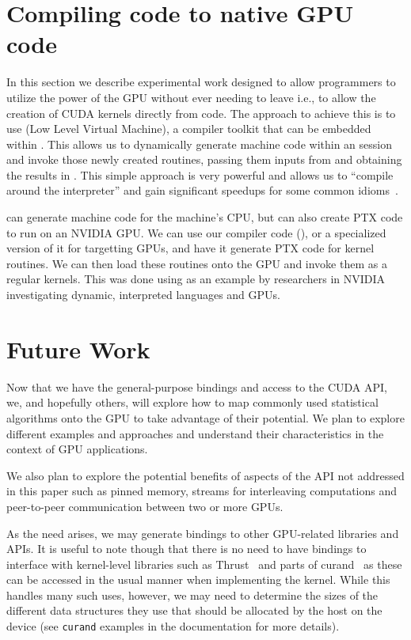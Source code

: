 \documentclass[article]{jss}
\def\R{\proglang{R}}
\def\llvm{\proglang{LLVM}}
\def\Rpkg#1{\pkg{#1}}
\begin{document}
\section[Compiling R code to native GPU code]{Compiling \R{} code to native GPU code}\label{sec:LLVM}
In this section we describe experimental work designed to 
allow programmers to utilize the power of the GPU without
ever needing to leave \R{} i.e., to allow the creation of CUDA
kernels directly from \R{} code. The approach to achieve this
is to use \llvm{} (Low Level Virtual Machine), a compiler toolkit 
that can be embedded within \R. 
This allows us to dynamically generate machine code within an \R{}
session and invoke those newly created routines, passing them 
inputs from \R{} and obtaining the results in \R.
This simple approach is very powerful and allows us to ``compile around the \R{}
interpreter'' and gain significant speedups for some common \R{}
idioms~\cite{bib:StatSciLLVM}.

\llvm{} can generate machine code for the machine's CPU, but can also
create PTX code to run on an NVIDIA GPU.  We can use our \R{} compiler
code (\Rpkg{RLLVMCompile}), or a specialized version of it for
targetting GPUs, and have it generate PTX code for kernel routines.
We can then load these routines onto the GPU and invoke them as a
regular kernels.  This was done using \R{} as an example by
researchers in NVIDIA~\cite{bib:libNVVM} investigating dynamic, interpreted
languages and GPUs.

\section{Future Work}

Now that we have the general-purpose bindings and access to the CUDA
API, we, and hopefully others, will explore how to map commonly used
statistical algorithms onto the GPU to take advantage of their potential.  
We plan to explore different examples and approaches and understand their
characteristics in the context of GPU applications.  

We also plan to explore the potential benefits of aspects of the API
not addressed in this paper such as pinned memory, streams for
interleaving computations and peer-to-peer communication between 
two or more GPUs.

As the need arises, we may generate bindings to other GPU-related
libraries and APIs. It is useful to note though that there is no need to have \R{}
bindings to interface with kernel-level libraries such as
Thrust~\cite{bib:Thrust} and parts of curand~\cite{bib:curand} as 
these can be accessed in the usual manner when implementing the kernel.
While this handles many such uses, however, we may need to determine
the sizes of the different data structures they use that should be allocated
by the host on the device (see \texttt{curand} examples in the \Rpkg{RCUDA}
documentation for more details).


\end{document}
